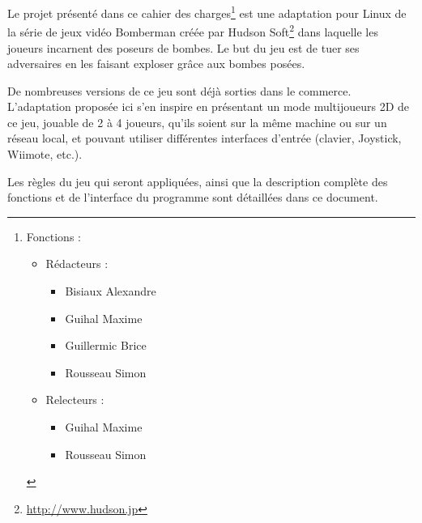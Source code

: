 Le projet présenté dans ce cahier des charges\footnote{Fonctions :
\begin{itemize}
\item Rédacteurs : \begin{itemize}
\item Bisiaux Alexandre
\item Guihal Maxime
\item Guillermic Brice
\item Rousseau Simon
\end{itemize}
\item Relecteurs :\begin{itemize}
 \item Guihal Maxime
\item Rousseau Simon
\end{itemize}
\end{itemize}
} est une adaptation pour Linux de la série de jeux vidéo Bomberman créée par Hudson Soft\footnote{\url{http://www.hudson.jp}} dans laquelle les joueurs incarnent des poseurs de bombes. Le but du jeu est de tuer ses adversaires en les faisant exploser grâce aux bombes posées.

\vspace{0.5cm}

De nombreuses versions de ce jeu sont déjà sorties dans le commerce. L'adaptation proposée ici s'en inspire en présentant un mode multijoueurs 2D de ce jeu, jouable de 2 à 4 joueurs, qu'ils soient sur la même machine ou sur un réseau local, et pouvant utiliser différentes interfaces d'entrée (clavier, Joystick, Wiimote, etc.).

\vspace{0.5cm}

Les règles du jeu qui seront appliquées, ainsi que la description complète des fonctions et de l'interface du programme sont détaillées dans ce document.